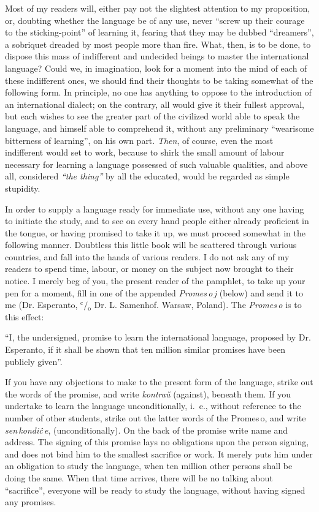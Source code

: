 \documentclass[12pt,twoside]{book}
\begin{document}
Most of my readers will, either pay not the slightest attention to my proposition, or, doubting whether the language be of any use, never “screw up their courage to the sticking-point” of learning it, fearing that they may be dubbed “dreamers”, a sobriquet dreaded by most people more than fire. What, then, is to be done, to dispose this mass of indifferent and undecided beings to master the international language? Could we, in imagination, look for a moment into the mind of each of these indifferent ones, we should find their thoughts to be taking somewhat of the following form. In principle, no one has anything to oppose to the introduction of an international dialect; on the contrary, all would give it their fullest approval, but each wishes to see the greater part of the civilized world able to speak the language, and himself able to comprehend it, without any preliminary “wearisome bitterness of learning”, on his own part. \emph{Then}, of course, even the most indifferent would set to work, because to shirk the small amount of labour necessary for learning a language possessed of such valuable qualities, and above all, considered \emph{``the thing''} by all the educated, would be regarded as simple stupidity.

In order to supply a language ready for immediate use, without any one having to initiate the study, and to see on every hand people either already proficient in the tongue, or having promised to take it up, we must proceed somewhat in the following manner. Doubtless this little book will be scattered through various countries, and fall into the hands of various readers. I do not ask any of my readers to spend time, labour, or money on the subject now brought to their notice. I merely beg of you, the present reader of the pamphlet, to take up your pen for a moment, fill in one of the appended \emph{\glqq Promes\,o\,j\grqq} (below) and send it to me (Dr. Esperanto, $\mathrm{^c\!/\!_o}$ Dr. L. Samenhof. Warsaw, Poland). The \emph{\glqq Promes\,o\grqq} is to this effect:

\begin{adjustwidth}{1cm}{1cm}
\hspace{1.5em} “I, the undersigned, promise to learn the international language, proposed by Dr. Es\-per\-anto, if it shall be shown that ten million similar promises have been publicly given”.
\end{adjustwidth}

If you have any objections to make to the present form of the language, strike out the words of the promise, and write \emph{\glqq kontraŭ\grqq} (against), beneath them. If you undertake to learn the language unconditionally, i.~e., without reference to the number of other students, strike out the latter words of the \glqq Promes\,o\grqq, and write \emph{\glqq{}sen\,kondiĉ\,e\grqq{}}, (unconditionally). On the back of the promise write name and address. The signing of this promise lays no obligations upon the person signing, and does not bind him to the smallest sacrifice or work. It merely puts him under an obligation to study the language, when ten million other persons shall be doing the same. When that time arrives, there will be no talking about ``sacrifice'', everyone will be ready to study the language, without having signed any promises.
\end{document}
